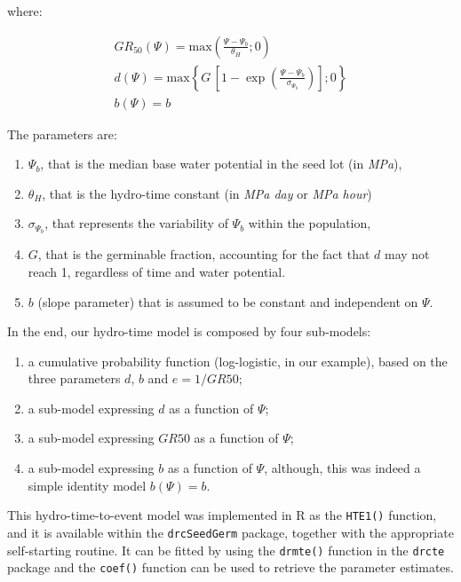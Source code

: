 \documentclass[
]{book}
\providecommand{\tightlist}{%
  \setlength{\itemsep}{0pt}\setlength{\parskip}{0pt}}
\begin{document}
where:

\[{\begin{array}{l}
GR_{50}(\Psi) = \textrm{max} \left( \frac{\Psi - \Psi_{b}}{\theta_H}; 0 \right)\\
d(\Psi ) = \textrm{max} \left\{ G \, \left[ 1 - \exp \left( \frac{ \Psi - \Psi_b }{\sigma_{\Psi_b}} \right) \right]; 0 \right\}\\
b(\Psi) = b
\end{array}}\]

The parameters are:

\begin{enumerate}
\def\labelenumi{\arabic{enumi}.}
\tightlist
\item
  \(\Psi_{b}\), that is the median base water potential in the seed lot (in \emph{MPa}),
\item
  \(\theta_H\), that is the hydro-time constant (in \emph{MPa day} or \emph{MPa hour})
\item
  \(\sigma_{\Psi_b}\), that represents the variability of \(\Psi_b\) within the population,
\item
  \(G\), that is the germinable fraction, accounting for the fact that \(d\) may not reach 1, regardless of time and water potential.
\item
  \(b\) (slope parameter) that is assumed to be constant and independent on \(\Psi\).
\end{enumerate}

In the end, our hydro-time model is composed by four sub-models:

\begin{enumerate}
\def\labelenumi{\arabic{enumi}.}
\tightlist
\item
  a cumulative probability function (log-logistic, in our example), based on the three parameters \(d\), \(b\) and \(e = 1/GR50\);
\item
  a sub-model expressing \(d\) as a function of \(\Psi\);
\item
  a sub-model expressing \(GR50\) as a function of \(\Psi\);
\item
  a sub-model expressing \(b\) as a function of \(\Psi\), although, this was indeed a simple identity model \(b(\Psi) = b\).
\end{enumerate}

This hydro-time-to-event model was implemented in R as the \texttt{HTE1()} function, and it is available within the \texttt{drcSeedGerm} package, together with the appropriate self-starting routine. It can be fitted by using the \texttt{drmte()} function in the \texttt{drcte} package and the \texttt{coef()} function can be used to retrieve the parameter estimates.
\end{document}

